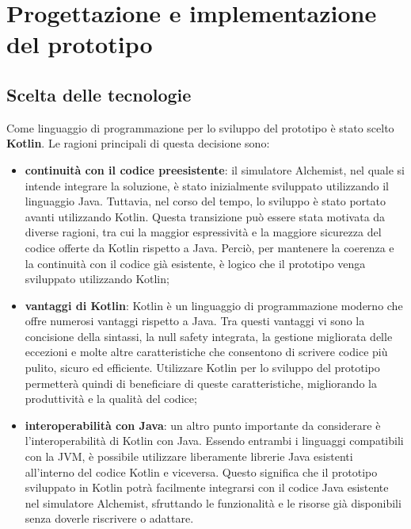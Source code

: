 \documentclass[12pt,a4paper,openright,twoside]{book}
\begin{document}
\chapter{Progettazione e implementazione del prototipo}
\section{Scelta delle tecnologie}
Come linguaggio di programmazione per lo sviluppo del prototipo è stato scelto \textbf{Kotlin}. Le ragioni principali di questa decisione sono: 
\begin{itemize}
    \item \textbf{continuità con il codice preesistente}: il simulatore Alchemist, nel quale si intende integrare la soluzione, è stato inizialmente sviluppato utilizzando il linguaggio Java. Tuttavia, nel corso del tempo, lo sviluppo è stato portato avanti utilizzando Kotlin.  Questa transizione può essere stata motivata da diverse ragioni, tra cui la maggior espressività e la maggiore sicurezza del codice offerte da Kotlin rispetto a Java. Perciò, per mantenere la coerenza e la continuità con il codice già esistente, è logico che il prototipo venga sviluppato utilizzando Kotlin;
    \item \textbf{vantaggi di Kotlin}: Kotlin è un linguaggio di programmazione moderno che offre numerosi vantaggi rispetto a Java. Tra questi vantaggi vi sono la concisione della sintassi, la null safety integrata, la gestione migliorata delle eccezioni e molte altre caratteristiche che consentono di scrivere codice più pulito, sicuro ed efficiente. Utilizzare Kotlin per lo sviluppo del prototipo permetterà quindi di beneficiare di queste caratteristiche, migliorando la produttività e la qualità del codice;
    \item \textbf{interoperabilità con Java}: un altro punto importante da considerare è l'interoperabilità di Kotlin con Java. Essendo entrambi i linguaggi compatibili con la JVM, è possibile utilizzare liberamente librerie Java esistenti all'interno del codice Kotlin e viceversa. Questo significa che il prototipo sviluppato in Kotlin potrà facilmente integrarsi con il codice Java esistente nel simulatore Alchemist, sfruttando le funzionalità e le risorse già disponibili senza doverle riscrivere o adattare.
\end{itemize}
\end{document}
